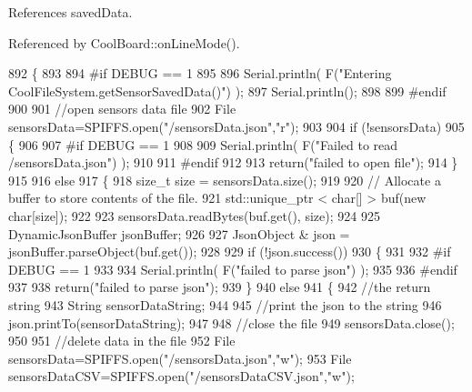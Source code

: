References saved\+Data.



Referenced by Cool\+Board\+::on\+Line\+Mode().


\begin{DoxyCode}
892 \{
893 
894 \textcolor{preprocessor}{#if DEBUG == 1 }
895 
896     Serial.println( F(\textcolor{stringliteral}{"Entering CoolFileSystem.getSensorSavedData()"}) );
897     Serial.println();
898 
899 \textcolor{preprocessor}{#endif}
900 
901     \textcolor{comment}{//open sensors data file}
902     File sensorsData=SPIFFS.open(\textcolor{stringliteral}{"/sensorsData.json"},\textcolor{stringliteral}{"r"});
903     
904     \textcolor{keywordflow}{if} (!sensorsData)
905     \{
906 
907 \textcolor{preprocessor}{    #if DEBUG == 1 }
908 
909         Serial.println( F(\textcolor{stringliteral}{"Failed to read /sensorsData.json"}) );
910 
911 \textcolor{preprocessor}{    #endif}
912  
913         \textcolor{keywordflow}{return}(\textcolor{stringliteral}{"failed to open file"});
914     \}
915 
916     \textcolor{keywordflow}{else}
917     \{
918         \textcolor{keywordtype}{size\_t} size = sensorsData.size();
919 
920         \textcolor{comment}{// Allocate a buffer to store contents of the file.}
921         std::unique\_ptr < char[] > buf(\textcolor{keyword}{new} \textcolor{keywordtype}{char}[size]);
922 
923         sensorsData.readBytes(buf.get(), size);
924 
925         DynamicJsonBuffer jsonBuffer;
926 
927         JsonObject & json = jsonBuffer.parseObject(buf.get());
928         
929         \textcolor{keywordflow}{if} (!json.success())
930         \{
931 
932 \textcolor{preprocessor}{        #if DEBUG == 1}
933         
934             Serial.println( F(\textcolor{stringliteral}{"failed to parse json"}) );
935         
936 \textcolor{preprocessor}{        #endif}
937         
938             \textcolor{keywordflow}{return}(\textcolor{stringliteral}{"failed to parse json"});
939         \}
940         \textcolor{keywordflow}{else}
941         \{   
942             \textcolor{comment}{//the return string}
943             String sensorDataString;
944             
945             \textcolor{comment}{//print the json to the string}
946             json.printTo(sensorDataString);
947             
948             \textcolor{comment}{//close the file}
949             sensorsData.close();
950 
951             \textcolor{comment}{//delete data in the file}
952             File sensorsData=SPIFFS.open(\textcolor{stringliteral}{"/sensorsData.json"},\textcolor{stringliteral}{"w"});
953             File sensorsDataCSV=SPIFFS.open(\textcolor{stringliteral}{"/sensorsDataCSV.json"},\textcolor{stringliteral}{"w"});

\end{DoxyCode}
